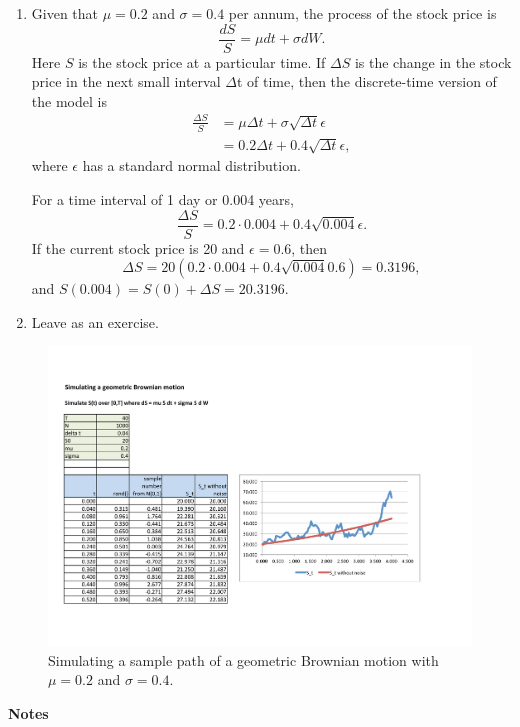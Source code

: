\documentclass[
]{book}
\theoremstyle{definition}
\theoremstyle{definition}
\theoremstyle{definition}
\theoremstyle{definition}
\theoremstyle{remark}
\begin{document}
\begin{enumerate}
\def\labelenumi{\arabic{enumi}.}
\item
  Given that \(\mu = 0.2\) and \(\sigma = 0.4\) per annum, the process of
  the stock price is \[\frac{dS}{S} = \mu dt + \sigma dW.\] Here \(S\)
  is the stock price at a particular time. If \(\Delta S\) is the change
  in the stock price in the next small interval \(\Delta\)t of time,
  then the discrete-time version of the model is \[\begin{aligned}
      \frac{\Delta S}{S} &= \mu \Delta t + \sigma \sqrt{\Delta t} \epsilon \\
                     &= 0.2 \Delta t + 0.4 \sqrt{\Delta t} \epsilon,
      \end{aligned}\] where \(\epsilon\) has a standard normal
  distribution.

  For a time interval of 1 day or 0.004 years,
  \[\frac{\Delta S}{S} = 0.2 \cdot 0.004 + 0.4 \sqrt{0.004} \epsilon.\]
  If the current stock price is 20 and \(\epsilon = 0.6\), then
  \[\Delta S = 20(0.2 \cdot 0.004 + 0.4 \sqrt{0.004} 0.6) = 0.3196,\]
  and \(S(0.004) = S(0) + \Delta S = 20.3196.\)
\item
  Leave as an exercise.
\end{enumerate}

\begin{figure}
\hypertarget{fig:GBM}{%
\centering
\includegraphics[width=8in,height=\textheight]{GBM.pdf}
\caption{Simulating a sample path of a geometric Brownian motion with
\(\mu =0.2\) and \(\sigma = 0.4\).}\label{fig:GBM}
}
\end{figure}

\textbf{Notes}
\end{document}
